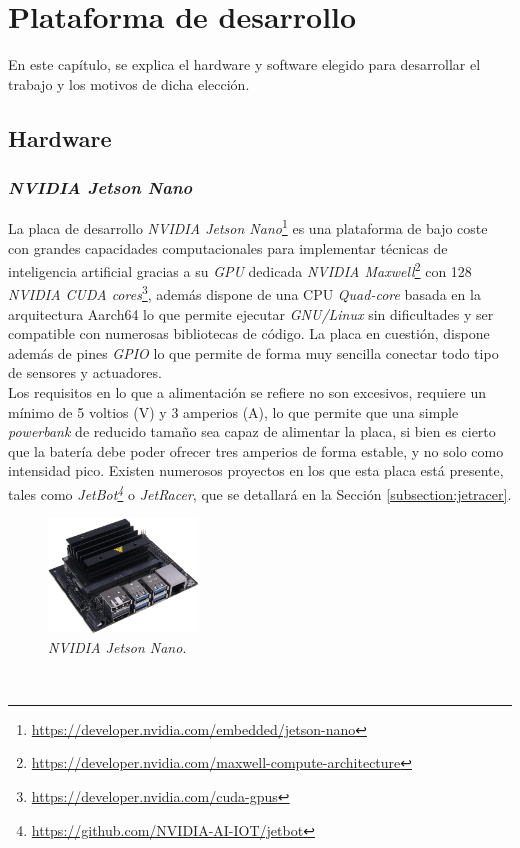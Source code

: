 \chapter{Plataforma de desarrollo}
\label{cap:capitulo3}

En este capítulo, se explica el hardware y software elegido para desarrollar el trabajo y los motivos de dicha elección.

\section{Hardware}
\subsection{\textit{NVIDIA Jetson Nano}}
\label{subsection:jetsonnano}
La placa de desarrollo \textit{NVIDIA Jetson Nano}\footnote{\url{https://developer.nvidia.com/embedded/jetson-nano}} es una plataforma de bajo coste con grandes capacidades computacionales para implementar técnicas de inteligencia artificial gracias a su \textit{GPU} dedicada \textit{NVIDIA Maxwell}\footnote{\url{https://developer.nvidia.com/maxwell-compute-architecture}} con 128 \textit{NVIDIA CUDA cores}\footnote{\url{https://developer.nvidia.com/cuda-gpus}}, además dispone de una CPU \textit{Quad-core} basada en la arquitectura Aarch64 lo que permite ejecutar \textit{GNU/Linux} sin dificultades y ser compatible con numerosas bibliotecas de código. La placa en cuestión, dispone además de pines \textit{GPIO} lo que permite de forma muy sencilla conectar todo tipo de sensores y actuadores.\\

Los requisitos en lo que a alimentación se refiere no son excesivos, requiere un mínimo de 5 voltios (V) y 3 amperios (A), lo que permite que una simple \textit{powerbank} de reducido tamaño sea capaz de alimentar la placa, si bien es cierto que la batería debe poder ofrecer tres amperios de forma estable, y no solo como intensidad pico. Existen numerosos proyectos en los que esta placa está presente, tales como \textit{JetBot\footnote{\url{https://github.com/NVIDIA-AI-IOT/jetbot}}} o \textit{JetRacer}, que se detallará en la Sección \ref{subsection:jetracer}.\\

\begin{figure} [h!]
	\begin{center}
		\includegraphics[width=4cm]{figs/jetsonnano}
	\end{center}
	\caption{\textit{NVIDIA Jetson Nano}.}
	\label{fig:jetsonnano}
\end{figure}\

